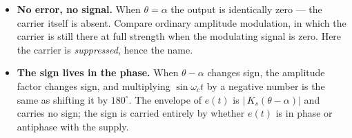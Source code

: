 \documentclass[11pt,a4paper]{article}
\begin{document}
\begin{itemize}[leftmargin=1.5em,itemsep=2pt]
\item \textbf{No error, no signal.} When $\theta=\alpha$ the output is
      identically zero --- the carrier itself is absent. Compare ordinary
      amplitude modulation, in which the carrier is still there at full
      strength when the modulating signal is zero. Here the carrier is
      \emph{suppressed}, hence the name.
\item \textbf{The sign lives in the phase.} When $\theta-\alpha$ changes sign,
      the amplitude factor changes sign, and multiplying $\sin\omega_{c}t$ by
      a negative number is the same as shifting it by $180^\circ$. The
      envelope of $e(t)$ is $|\,K_{s}(\theta-\alpha)|$ and carries no sign; the
      sign is carried entirely by whether $e(t)$ is in phase or antiphase with
      the supply.
\end{itemize}
\end{document}

